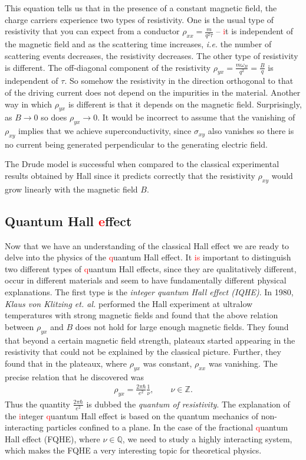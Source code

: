          This equation tells us that in the presence of a constant magnetic field, the charge carriers experience two types of resistivity. One is the usual type of resistivity that you can expect from a conductor $\rho_{xx} = \frac{m}{q^2\tau}$ -- \textcolor{red}{i}t is independent of the magnetic field and as the scattering time increases, \textit{i.e.} the number of scattering events decreases, the resistivity decreases. The other type of resistivity is different. The off-diagonal component of the resistivity $\rho_{yx} = \frac{m \omega_B}{q^2}= \frac{B}{q}$ is independent of $\tau$. So somehow the resistivity in the direction orthogonal to that of the driving current does not depend on the impurities in the material. Another way in which $\rho_{yx}$ is different is that it depends on the magnetic field. Surprisingly, as $B\rightarrow 0$ so does $\rho_{yx} \rightarrow 0$. It would be incorrect to assume that the vanishing of $\rho_{xy}$ implies that we achieve superconductivity, since $\sigma_{xy}$ also vanishes so there is no current being generated perpendicular to the generating electric field.

        The Drude model is successful when compared to the classical experimental results obtained by Hall since it predicts correctly that the resistivity  $\rho_{xy}$ would grow linearly with the magnetic field $B$.
        \subsection{Quantum Hall \textcolor{red}{e}ffect}
        Now that we have an understanding of the classical Hall effect we are ready to delve into the physics of the \textcolor{red}{q}uantum Hall effect. It \textcolor{red}{is} important to distinguish two different types of \textcolor{red}{q}uantum Hall effects, since they are qualitatively different, occur in different materials and seem to have fundamentally different physical explanations.
        The first type is the \textit{integer quantum Hall effect (IQHE)}. In 1980, \textit{Klaus von Klitzing et. al.} \cite{vonKlitzing:1980pdk} performed the Hall experiment at ultralow temperatures with strong magnetic fields and found that the above relation between $\rho_{yx}$ and $B$ does not hold for large enough magnetic fields. They found that beyond a certain magnetic field strength, plateaux started appearing in the resistivity that could not be explained by the classical picture. Further, they found that in the plateaux, where $\rho_{yx}$ was constant, $\rho_{xx}$ was vanishing. The precise relation that he discovered was
        \begin{align}
            \rho_{yx} = \frac{2 \pi \hbar}{e^2} \frac{1}{\nu}, \qquad \nu \in \mathbb{Z}.
        \end{align}
        Thus the quantity $\frac{2 \pi \hbar}{e^2}$ is dubbed the \textit{quantum of resistivity}. The explanation of the \textcolor{red}{i}nteger \textcolor{red}{q}uantum Hall effect is based on the quantum mechanics of non-interacting particles confined to a plane. In the case of the fractional \textcolor{red}{q}uantum Hall effect (FQHE), where $\nu \in \mathbb{Q}$, we need to study a highly interacting system, which makes the FQHE a very interesting topic for theoretical physics.

